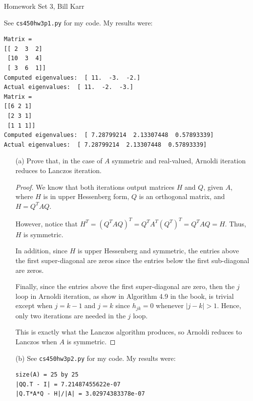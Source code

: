 \documentclass[10pt]{article}
\begin{document}
%
{Homework Set 3, Bill Karr}


See \verb+cs450hw3p1.py+ for my code. My results were: \begin{verbatim}
Matrix =
[[ 2  3  2]
 [10  3  4]
 [ 3  6  1]]
Computed eigenvalues:  [ 11.  -3.  -2.]
Actual eigenvalues:  [ 11.  -2.  -3.]
Matrix =
[[6 2 1]
 [2 3 1]
 [1 1 1]]
Computed eigenvalues:  [ 7.28799214  2.13307448  0.57893339]
Actual eigenvalues:  [ 7.28799214  2.13307448  0.57893339]
\end{verbatim}


\begin{enumerate}

\item[(a)] Prove that, in the case of $A$ symmetric and real-valued, Arnoldi iteration reduces to Lanczos iteration.

\begin{proof}
We know that both iterations output matrices $H$ and $Q$, given $A$, where $ H $ is in upper Hessenberg form, $Q$ is an orthogonal matrix, and $ H = Q^T A Q $.

However, notice that $ H^T = ( Q^T A Q )^T = Q^T A^T (Q^T)^T = Q^T A Q = H$. Thus, $H$ is symmetric.

In addition, since $H$ is upper Hessenberg and symmetric, the entries above the first super-diagonal are zeros since the entries below the first sub-diagonal are zeros. 

Finally, since the entries above the first super-diagonal are zero, then the $j$ loop in Arnoldi iteration, as show in Algorithm 4.9 in the book, is trivial except when $ j = k-1 $ and $ j = k $ since $ h_{jk} = 0 $ whenever $ | j - k | > 1 $. Hence, only two iterations are needed in the $j$ loop. 

This is exactly what the Lanczos algorithm produces, so Arnoldi reduces to Lanczos when $A$ is symmetric.
\end{proof}

\item[(b)] See \verb+cs450hw3p2.py+ for my code. My results were: \begin{verbatim} 
size(A) = 25 by 25
|QQ.T - I| = 7.21487455622e-07
|Q.T*A*Q - H|/|A| = 3.02974383378e-07 
\end{verbatim}


\end{enumerate}
\end{document}
